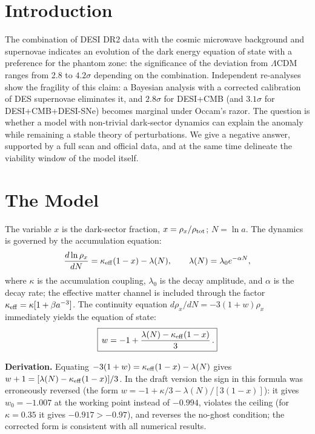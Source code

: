\documentclass[11pt,a4paper]{article}
\begin{document}
\section{Introduction}
The combination of DESI DR2 data with the cosmic microwave background and supernovae indicates an evolution of the dark energy equation of state with a preference for the phantom zone: the significance of the deviation from $\Lambda$CDM ranges from 2.8 to $4.2\sigma$ depending on the combination. Independent re-analyses show the fragility of this claim: a Bayesian analysis with a corrected calibration of DES supernovae eliminates it, and $2.8\sigma$ for DESI+CMB (and $3.1\sigma$ for DESI+CMB+DESI-SNe) becomes marginal under Occam's razor. The question is whether a model with non-trivial dark-sector dynamics can explain the anomaly while remaining a stable theory of perturbations. We give a negative answer, supported by a full scan and official data, and at the same time delineate the viability window of the model itself.

\section{The Model}
The variable $x$ is the dark-sector fraction, $x=\rho_x/\rho_{\rm tot}$; $N=\ln a$. The dynamics is governed by the accumulation equation:
\begin{equation}
\frac{d\ln\rho_x}{dN}=\kappa_{\rm eff}(1-x)-\lambda(N),\qquad
\lambda(N)=\lambda_0 e^{-\alpha N},
\label{eq:accum}
\end{equation}
where $\kappa$ is the accumulation coupling, $\lambda_0$ is the decay amplitude, and $\alpha$ is the decay rate; the effective matter channel is included through the factor $\kappa_{\rm eff}=\kappa[1+\beta a^{-3}]$. The continuity equation $d\rho_x/dN=-3(1+w)\rho_x$ immediately yields the equation of state:
\begin{equation}
\boxed{\,w=-1+\frac{\lambda(N)-\kappa_{\rm eff}(1-x)}{3}\,.}
\label{eq:w}
\end{equation}

\textbf{Derivation.} Equating $-3(1+w)=\kappa_{\rm eff}(1-x)-\lambda(N)$ gives $w+1=[\lambda(N)-\kappa_{\rm eff}(1-x)]/3$. In the draft version the sign in this formula was erroneously reversed (the form $w=-1+\kappa/3-\lambda(N)/[3(1-x)]$): it gives $w_0=-1.007$ at the working point instead of $-0.994$, violates the ceiling (for $\kappa=0.35$ it gives $-0.917>-0.97$), and reverses the no-ghost condition; the corrected form is consistent with all numerical results.
\end{document}
